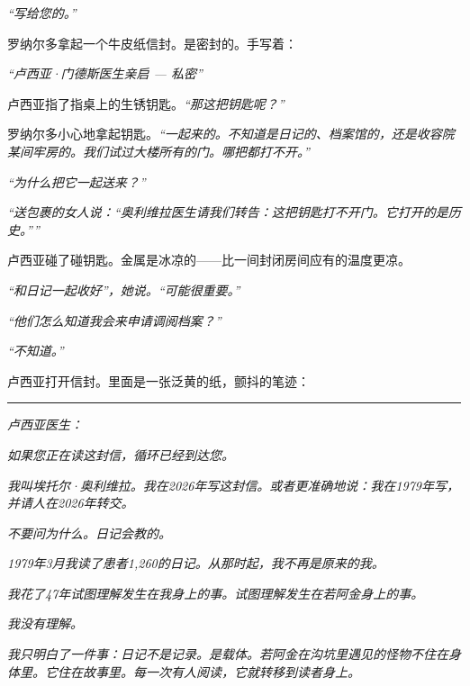 \noindent \textit{\textquotedblleft{}写给您的。\textquotedblright{}}

\noindent 罗纳尔多拿起一个牛皮纸信封。是密封的。手写着：

\noindent \textit{\textquotedblleft{}卢西亚·门德斯医生亲启 --- 私密\textquotedblright{}}

\noindent 卢西亚指了指桌上的生锈钥匙。\textit{\textquotedblleft{}那这把钥匙呢？\textquotedblright{}}

\noindent 罗纳尔多小心地拿起钥匙。\textit{\textquotedblleft{}一起来的。不知道是日记的、档案馆的，还是收容院某间牢房的。我们试过大楼所有的门。哪把都打不开。\textquotedblright{}}

\noindent \textit{\textquotedblleft{}为什么把它一起送来？\textquotedblright{}}

\noindent \textit{\textquotedblleft{}送包裹的女人说：\textquotedblleft{}奥利维拉医生请我们转告：这把钥匙打不开门。它打开的是历史。\textquotedblright{}\textquotedblright{}}

\noindent 卢西亚碰了碰钥匙。金属是冰凉的——比一间封闭房间应有的温度更凉。

\noindent \textit{\textquotedblleft{}和日记一起收好\textquotedblright{}，她说。\textquotedblleft{}可能很重要。\textquotedblright{}}

\noindent \textit{\textquotedblleft{}他们怎么知道我会来申请调阅档案？\textquotedblright{}}

\noindent \textit{\textquotedblleft{}不知道。\textquotedblright{}}

\noindent 卢西亚打开信封。里面是一张泛黄的纸，颤抖的笔迹：

\vspace{0.5em}\noindent\rule{\textwidth}{0.5pt}\vspace{0.5em}

\noindent \textit{卢西亚医生：}

\noindent \textit{如果您正在读这封信，循环已经到达您。}

\noindent \textit{我叫埃托尔·奥利维拉。我在2026年写这封信。或者更准确地说：我在1979年写，并请人在2026年转交。}

\noindent \textit{不要问为什么。日记会教的。}

\noindent \textit{1979年3月我读了患者1,260的日记。从那时起，我不再是原来的我。}

\noindent \textit{我花了47年试图理解发生在我身上的事。试图理解发生在若阿金身上的事。}

\noindent \textit{我没有理解。}

\noindent \textit{我只明白了一件事：日记不是记录。是载体。若阿金在沟坑里遇见的怪物不住在身体里。它住在故事里。每一次有人阅读，它就转移到读者身上。}

